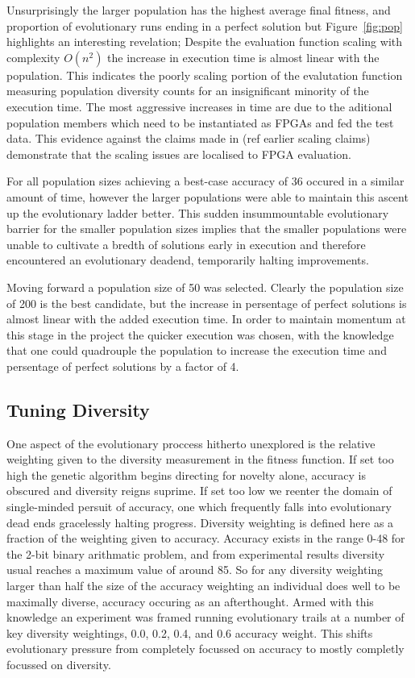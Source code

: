 Unsurprisingly the larger population has the highest average final fitness,
and proportion of evolutionary runs ending in a perfect solution but
Figure~\ref{fig:pop} highlights an interesting revelation; Despite the evaluation
function scaling with complexity $O(n^2)$ the increase in execution time is
almost linear with the population. This indicates the poorly scaling portion of
the evalutation function measuring population diversity counts for an insignificant
minority of the execution time. The most aggressive increases in time are due to
the aditional population members which need to be instantiated as FPGAs and
fed the test data. This evidence against the claims made in (\todo ref earlier scaling
claims) demonstrate that the scaling issues are localised to FPGA evaluation.

For all population sizes achieving a best-case accuracy of 36 occured in a
similar amount of time, however the larger populations were able to maintain
this ascent up the evolutionary ladder better. This sudden insummountable
evolutionary barrier for the smaller population sizes implies that the smaller
populations were unable to cultivate a bredth of solutions early in execution
and therefore encountered an evolutionary deadend, temporarily halting improvements.

Moving forward a population size of 50 was selected. Clearly the population size
of 200 is the best candidate, but the increase in persentage of perfect solutions is almost
linear with the added execution time. In order to maintain momentum at this stage
in the project the quicker execution was chosen, with the knowledge that one could
quadrouple the population to increase the execution time and persentage of perfect
solutions by a factor of 4.

\subsection{Tuning Diversity}

One aspect of the evolutionary proccess hitherto unexplored is the relative
weighting given to the diversity measurement in the fitness function. If
set too high the genetic algorithm begins directing for novelty alone,
accuracy is obscured and diversity reigns suprime. If set too low we reenter
the domain of single-minded persuit of accuracy, one which frequently
falls into evolutionary dead ends gracelessly halting progress. Diversity
weighting is defined here as a fraction of the weighting given to accuracy.
Accuracy exists in the range 0-48 for the 2-bit binary arithmatic problem,
and from experimental results diversity usual reaches a maximum value of
around 85. So for any diversity weighting larger than half the size of
the accuracy weighting an individual does well to be maximally diverse,
accuracy occuring as an afterthought. Armed with this knowledge an experiment
was framed running evolutionary
trails at a number of key diversity weightings, 0.0, 0.2, 0.4, and 0.6 accuracy weight.
This shifts evolutionary pressure from completely focussed on accuracy to mostly
completly focussed on diversity.

